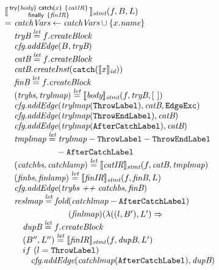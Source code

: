 \vspace*{-2em}
\[
\begin{array}{l@{}l@{~}l}
\lefteqn{\transfun{\irtryfull{\emph{body}}{x}{\emph{catIR}}{\emph{finIR}}}_{\emph{stmt}}(f, B, L)}\\
& = & \emph{catchVars} \leftarrow \emph{catchVars} \cup \{ x.\emph{name} \}\\
& & \emph{tryB} \letval f.\emph{createBlock}\\
& & \emph{cfg}.\emph{addEdge}(B, \emph{tryB})\\
& & \emph{catB} \letval f.\emph{createBlock}\\
& & \emph{catB}.\emph{createInst}(\TT{catch}(\transfun{x}_{\emph{id}}))\\
& & \emph{finB} \letval f.\emph{createBlock}\\
& & (\emph{trybs}, \emph{trylmap}) \letval \transfun{\emph{body}}_{\emph{stmt}}(f, \emph{tryB}, [\ ])\\
& & \emph{cfg}.\emph{addEdge}(\emph{trylmap}(\ThrowLabel), \emph{catB}, \EdgeExc)\\
& & \emph{cfg}.\emph{addEdge}(\emph{trylmap}(\ThrowEndLabel), \emph{catB})\\
& & \emph{cfg}.\emph{addEdge}(\emph{trylmap}(\AfterCatchLabel), \emph{catB})\\
& & \emph{tmplmap} \letval \emph{trylmap} - \ThrowLabel - \ThrowEndLabel\\
&& \phantom{\emph{tmplmap} \letval} - \AfterCatchLabel\\
& & (\emph{catchbs}, \emph{catchlamp}) \letval \transfun{\emph{catIR}}_{\emph{stmt}}(f, \emph{catB}, \emph{tmplmap})\\
& & (\emph{finbs}, \emph{finlamp}) \letval \transfun{\emph{finIR}}_{\emph{stmt}}(f, \emph{finB}, L)\\
& & \emph{cfg}.\emph{addEdge}(\emph{trybs} ~\emph{++}~ \emph{catchbs}, \emph{finB})\\
& & \emph{reslmap} \letval \fold(\emph{catchlmap} - \AfterCatchLabel)\\
& & \phantom{\emph{reslmap} \letval \fold}(\emph{finlmap})
(\lambda((l, B'), L') \Rightarrow \\
& & \quad \emph{dupB} \letval f.\emph{createBlock}\\
& & \quad (B'', L'') \letval \transfun{\emph{finIR}}_{\emph{stmt}}(f, \emph{dupB}, L')\\
& & \quad if\ (l = \ThrowLabel)\\
& & \quad \phantom{if} \emph{cfg}.\emph{addEdge}(\emph{catchlmap}(\AfterCatchLabel), \emph{dupB})\\

\end{array}\]
